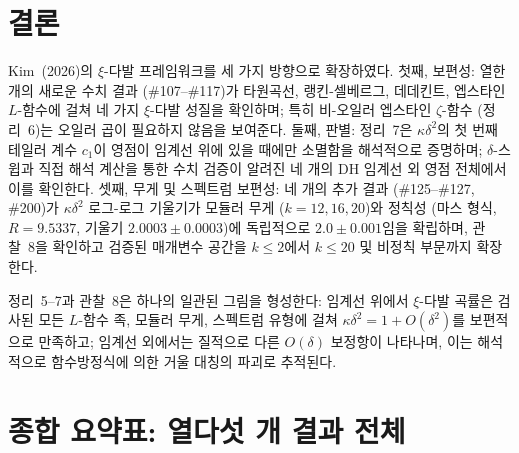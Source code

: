 \documentclass[11pt, a4paper]{article}
\theoremstyle{plain}
\theoremstyle{definition}
\begin{document}
\section{결론}
\label{sec:conclusion}

Kim~(2026)의 $\xi$-다발 프레임워크를 세 가지 방향으로 확장하였다.
첫째, 보편성: 열한 개의 새로운 수치 결과
(\#107--\#117)가 타원곡선, 랭킨-셀베르그, 데데킨트, 엡스타인
$L$-함수에 걸쳐 네 가지 $\xi$-다발 성질을 확인하며;
특히 비-오일러 엡스타인 $\zeta$-함수 (정리~6)는
오일러 곱이 필요하지 않음을 보여준다.
둘째, 판별: 정리~7은 $\kappa\delta^{2}$의 첫 번째 테일러 계수
$c_{1}$이 영점이 임계선 위에 있을 때에만 소멸함을 해석적으로 증명하며;
$\delta$-스윕과 직접 해석 계산을 통한 수치 검증이
알려진 네 개의 DH 임계선 외 영점 전체에서 이를 확인한다.
셋째, 무게 및 스펙트럼 보편성: 네 개의 추가 결과
(\#125--\#127, \#200)가 $\kappa\delta^{2}$ 로그-로그 기울기가
모듈러 무게 ($k=12,16,20$)와 정칙성 (마스 형식, $R=9.5337$,
기울기 $2.0003\pm 0.0003$)에 독립적으로 $2.0\pm 0.001$임을 확립하며,
관찰~8을 확인하고 검증된 매개변수 공간을 $k\leq 2$에서
$k\leq 20$ 및 비정칙 부문까지 확장한다.

정리~5--7과 관찰~8은 하나의 일관된 그림을 형성한다:
임계선 위에서 $\xi$-다발 곡률은 검사된 모든 $L$-함수 족,
모듈러 무게, 스펙트럼 유형에 걸쳐 $\kappa\delta^{2}=1+O(\delta^{2})$를
보편적으로 만족하고; 임계선 외에서는 질적으로 다른 $O(\delta)$ 보정항이
나타나며, 이는 해석적으로 함수방정식에 의한 거울 대칭의 파괴로 추적된다.


\appendix

\section{종합 요약표: 열다섯 개 결과 전체}
\label{app:summary}
\end{document}
